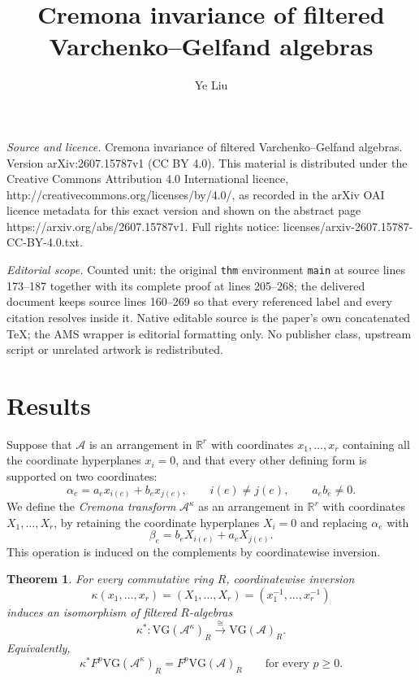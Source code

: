 \documentclass[10pt,a4paper]{amsart}
\numberwithin{equation}{section}
\newtheorem{thm}{Theorem}[section]
\numberwithin{equation}{section}
\newcommand{\R}{\mathbb{R}}
\newcommand{\A}{\mathcal{A}}
\newcommand{\VG}{\mathrm{VG}}
\begin{document}
\title[Cremona invariance of filtered Varchenko--Gelfand algebras]{Cremona invariance of filtered Varchenko--Gelfand algebras}
\author{Ye Liu}
\date{}
\maketitle
\noindent\emph{Source and licence.} Cremona invariance of filtered Varchenko--Gelfand algebras. Version arXiv:2607.15787v1 (CC BY 4.0). This material is distributed under the Creative Commons Attribution 4.0 International licence, http://creativecommons.org/licenses/by/4.0/, as recorded in the arXiv OAI licence metadata for this exact version and shown on the abstract page https://arxiv.org/abs/2607.15787v1. Full rights notice: licenses/arxiv-2607.15787-CC-BY-4.0.txt.\par\smallskip
\noindent\textit{Editorial scope.} Counted unit: the original \texttt{thm} environment \texttt{main} at source lines 173--187 together with its complete proof at lines 205--268; the delivered document keeps source lines 160--269 so that every referenced label and every citation resolves inside it. Native editable source is the paper's own concatenated TeX; the AMS wrapper is editorial formatting only. No publisher class, upstream script or unrelated artwork is redistributed.
\section{Results}\label{cremona}

Suppose that $\A$ is an arrangement in $\R^r$ with coordinates $x_1,\ldots,x_r$ containing all the coordinate hyperplanes $x_i=0$, and that every other defining form is supported on two coordinates:
\[
\alpha_e=a_ex_{i(e)}+b_ex_{j(e)},
\qquad i(e)\neq j(e),\qquad a_eb_e\neq0.
\]
We define the \emph{Cremona transform} $\A^\kappa$ as an arrangement in $\R^r$ with coordinates $X_1,\ldots,X_r$, by retaining the coordinate hyperplanes $X_i=0$ and replacing $\alpha_e$ with
\[
\beta_e=b_eX_{i(e)}+a_eX_{j(e)}.
\]
This operation is induced on the complements by coordinatewise inversion.


\begin{thm}\label{main}
For every commutative ring $R$, coordinatewise inversion
\[
\kappa(x_1,\ldots,x_r)=(X_1,\ldots,X_r)=\left(x_1^{-1},\ldots,x_r^{-1}\right)
\]
induces an isomorphism of filtered $R$-algebras
\[
\kappa^*:\VG(\A^\kappa)_R\xrightarrow{\ \cong\ }\VG(\A)_R.
\]
Equivalently,
\[
\kappa^*F^p\VG(\A^\kappa)_R=F^p\VG(\A)_R
\qquad\text{for every }p\geq0.
\]
\end{thm}
\end{document}
